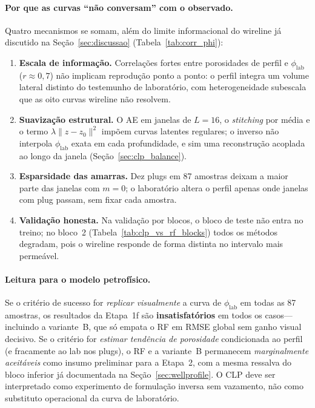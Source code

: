 \documentclass[11pt,a4paper]{article}
\newcommand{\philab}{\ensuremath{\phi_{\mathrm{lab}}}}
\begin{document}
\paragraph{Por que as curvas ``não conversam'' com o observado.}
Quatro mecanismos se somam, além do limite informacional do wireline já
discutido na Seção~\ref{sec:discussao} (Tabela~\ref{tab:corr_phi}):
\begin{enumerate}
  \item \textbf{Escala de informação.} Correlações fortes entre porosidades
        de perfil e \philab{} ($r\approx 0{,}7$) não implicam reprodução
        ponto a ponto: o perfil integra um volume lateral distinto do
        testemunho de laboratório, com heterogeneidade subescala que as
        oito curvas wireline não resolvem.
  \item \textbf{Suavização estrutural.} O AE em janelas de $L=16$, o
        \emph{stitching} por média e o termo $\lambda\|z-z_0\|^2$ impõem
        curvas latentes regulares; o inverso não interpola \philab{} exata
        em cada profundidade, e sim uma reconstrução acoplada ao longo da
        janela (Seção~\ref{sec:clp_balance}).
  \item \textbf{Esparsidade das amarras.} Dez plugs em 87 amostras
        deixam a maior parte das janelas com $m=0$; o laboratório altera
        o perfil apenas onde janelas com plug passam, sem fixar cada
        amostra.
  \item \textbf{Validação honesta.} Na validação por blocos, o bloco de
        teste não entra no treino; no bloco~2 (Tabela~\ref{tab:clp_vs_rf_blocks})
        todos os métodos degradam, pois o wireline responde de forma
        distinta no intervalo mais permeável.
\end{enumerate}

\paragraph{Leitura para o modelo petrofísico.}
Se o critério de sucesso for \emph{replicar visualmente} a curva de
\philab{} em todas as 87 amostras, os resultados da Etapa~1f são
\textbf{insatisfatórios} em todos os casos---incluindo a variante~B, que
só empata o RF em RMSE global sem ganho visual decisivo.
Se o critério for \emph{estimar tendência de porosidade} condicionada ao
perfil (e fracamente ao lab nos plugs), o RF e a variante~B permanecem
\emph{marginalmente aceitáveis} como insumo preliminar para a Etapa~2,
com a mesma ressalva do bloco inferior já documentada na
Seção~\ref{sec:wellprofile}.
O CLP deve ser interpretado como experimento de formulação inversa sem
vazamento, não como substituto operacional da curva de laboratório.
\end{document}
